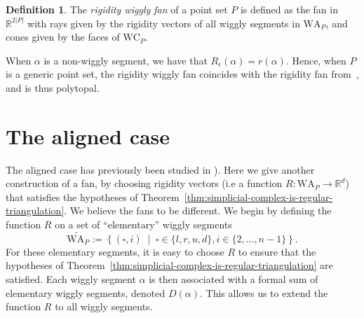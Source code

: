 \documentclass{amsart}
\newtheorem{lemma}[theorem]{Lemma}
\theoremstyle{definition}
\newtheorem{definition}[theorem]{Definition}
\newcommand{\R}{\mathbb{R}} %
\newcommand{\set}[2]{\left\{ #1 \;\middle|\; #2 \right\}} %
\newcommand{\cardinal}[1]{\left\lvert{#1}\right\rvert} %
\newcommand{\wigglyArcs}{\mathrm{WA}} %
\newcommand{\reducedWigglyComplex}{\mathrm{WC}} %
\newcommand{\defn}[1]{\textsl{\color{darkblue} #1}} %
\begin{document}
\begin{definition}
    The \defn{rigidity wiggly fan} of a point set $P$ is defined as the fan in $\R^{2\cardinal{P}}$
    with rays given by the rigidity vectors of all wiggly segments in $\wigglyArcs_P$,
    and cones given by the faces of $\reducedWigglyComplex_P$.
\end{definition}

When $\alpha$ is a non-wiggly segment, we have that $R_\epsilon(\alpha) = r(\alpha)$.
Hence, when $P$ is a generic point set, the rigidity wiggly fan coincides with the
rigidity fan from~\cite{RoteSantosStreinu03}, and is thus polytopal.

%
%    
%
%


\section{The aligned case}

The aligned case has previously been studied in \cite{BapatPilaud25}). Here we give another construction of a fan, by choosing rigidity vectors (i.e a function $R:\wigglyArcs_P\to \R^d$) that satisfies the hypotheses of Theorem~\ref{thm:simplicial-complex-is-regular-triangulation}. We believe the fans to be different.
%
We begin by defining the function $R$ on a set of ``elementary'' wiggly segments
\[
\widetilde {\wigglyArcs_P}:=\set{(\square,i)}{\square \in \{l,r,u,d\}, i\in \{2,\ldots,n-1\}}.
\]
For these elementary segments, it is easy to choose $R$ to ensure that the hypotheses of Theorem~\ref{thm:simplicial-complex-is-regular-triangulation} are satisfied.
%
Each wiggly segment $\alpha$ is then associated with a formal sum of elementary wiggly segments, denoted $D(\alpha)$. This allows us to extend the function $R$ to all wiggly segments. 
\end{document}
